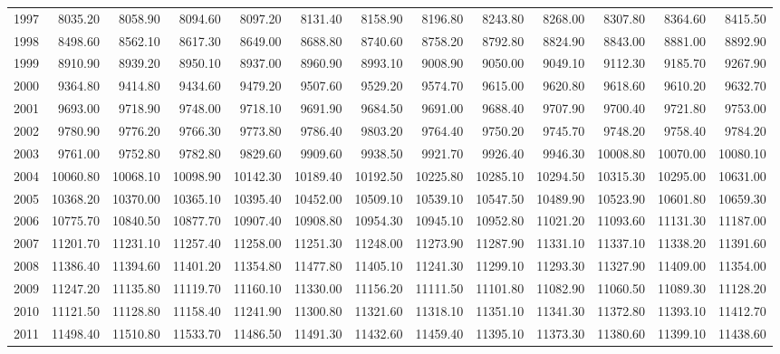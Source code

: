 \begin{longtable}{rrrrrrrrrrrrr}
  1997 & 8035.20 & 8058.90 & 8094.60 & 8097.20 & 8131.40 & 8158.90 & 8196.80 & 8243.80 & 8268.00 & 8307.80 & 8364.60 & 8415.50 \\ 
  1998 & 8498.60 & 8562.10 & 8617.30 & 8649.00 & 8688.80 & 8740.60 & 8758.20 & 8792.80 & 8824.90 & 8843.00 & 8881.00 & 8892.90 \\ 
  1999 & 8910.90 & 8939.20 & 8950.10 & 8937.00 & 8960.90 & 8993.10 & 9008.90 & 9050.00 & 9049.10 & 9112.30 & 9185.70 & 9267.90 \\ 
  2000 & 9364.80 & 9414.80 & 9434.60 & 9479.20 & 9507.60 & 9529.20 & 9574.70 & 9615.00 & 9620.80 & 9618.60 & 9610.20 & 9632.70 \\ 
  2001 & 9693.00 & 9718.90 & 9748.00 & 9718.10 & 9691.90 & 9684.50 & 9691.00 & 9688.40 & 9707.90 & 9700.40 & 9721.80 & 9753.00 \\ 
  2002 & 9780.90 & 9776.20 & 9766.30 & 9773.80 & 9786.40 & 9803.20 & 9764.40 & 9750.20 & 9745.70 & 9748.20 & 9758.40 & 9784.20 \\ 
  2003 & 9761.00 & 9752.80 & 9782.80 & 9829.60 & 9909.60 & 9938.50 & 9921.70 & 9926.40 & 9946.30 & 10008.80 & 10070.00 & 10080.10 \\ 
  2004 & 10060.80 & 10068.10 & 10098.90 & 10142.30 & 10189.40 & 10192.50 & 10225.80 & 10285.10 & 10294.50 & 10315.30 & 10295.00 & 10631.00 \\ 
  2005 & 10368.20 & 10370.00 & 10365.10 & 10395.40 & 10452.00 & 10509.10 & 10539.10 & 10547.50 & 10489.90 & 10523.90 & 10601.80 & 10659.30 \\ 
  2006 & 10775.70 & 10840.50 & 10877.70 & 10907.40 & 10908.80 & 10954.30 & 10945.10 & 10952.80 & 11021.20 & 11093.60 & 11131.30 & 11187.00 \\ 
  2007 & 11201.70 & 11231.10 & 11257.40 & 11258.00 & 11251.30 & 11248.00 & 11273.90 & 11287.90 & 11331.10 & 11337.10 & 11338.20 & 11391.60 \\ 
  2008 & 11386.40 & 11394.60 & 11401.20 & 11354.80 & 11477.80 & 11405.10 & 11241.30 & 11299.10 & 11293.30 & 11327.90 & 11409.00 & 11354.00 \\ 
  2009 & 11247.20 & 11135.80 & 11119.70 & 11160.10 & 11330.00 & 11156.20 & 11111.50 & 11101.80 & 11082.90 & 11060.50 & 11089.30 & 11128.20 \\ 
  2010 & 11121.50 & 11128.80 & 11158.40 & 11241.90 & 11300.80 & 11321.60 & 11318.10 & 11351.10 & 11341.30 & 11372.80 & 11393.10 & 11412.70 \\ 
  2011 & 11498.40 & 11510.80 & 11533.70 & 11486.50 & 11491.30 & 11432.60 & 11459.40 & 11395.10 & 11373.30 & 11380.60 & 11399.10 & 11438.60 \\ 

\end{longtable}
